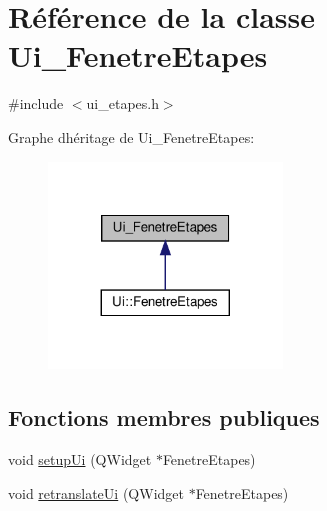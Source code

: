 \hypertarget{class_ui___fenetre_etapes}{}\section{Référence de la classe Ui\+\_\+\+Fenetre\+Etapes}
\label{class_ui___fenetre_etapes}


{\ttfamily \#include $<$ui\+\_\+etapes.\+h$>$}



Graphe d\textquotesingle{}héritage de Ui\+\_\+\+Fenetre\+Etapes\+:
\nopagebreak
\begin{figure}[H]
\begin{center}
\leavevmode
\includegraphics[width=176pt]{class_ui___fenetre_etapes__inherit__graph}
\end{center}
\end{figure}
\subsection*{Fonctions membres publiques}
\begin{DoxyCompactItemize}
\item 
void \hyperlink{class_ui___fenetre_etapes_a5bf35503b72beb223e5a03ea046524a1}{setup\+Ui} (Q\+Widget $\ast$Fenetre\+Etapes)
\item 
void \hyperlink{class_ui___fenetre_etapes_a12b8a73438c7adfe883f9deb6af95426}{retranslate\+Ui} (Q\+Widget $\ast$Fenetre\+Etapes)
\end{DoxyCompactItemize}
